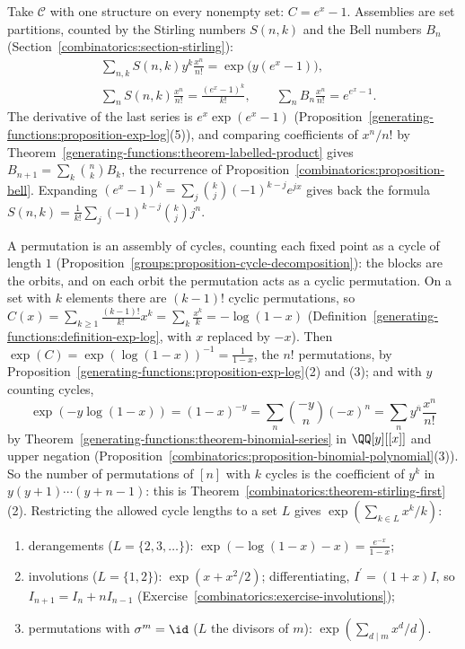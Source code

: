 \begin{example}\label{generating-functions:example-egf-partitions}
Take $\mathcal{C}$ with one structure on every nonempty set: $C = e^x - 1$. Assemblies are set partitions, counted by the Stirling numbers $S(n, k)$ and the Bell numbers $B_n$
(Section~\ref{combinatorics:section-stirling}):
\[
\begin{aligned}
&\sum_{n,k}S(n, k)y^k\frac{x^n}{n!} = \exp\bigl(y(e^x - 1)\bigr),\\
&\sum_nS(n, k)\frac{x^n}{n!} = \frac{(e^x - 1)^k}{k!}, \qquad \sum_nB_n\frac{x^n}{n!} = e^{e^x - 1}.
\end{aligned}
\]
The derivative of the last series is $e^x\exp(e^x - 1)$ (Proposition~\ref{generating-functions:proposition-exp-log}(5)), and comparing coefficients of $x^n/n!$ by
Theorem~\ref{generating-functions:theorem-labelled-product} gives $B_{n+1} = \sum_k\binom{n}{k}B_k$, the recurrence of Proposition~\ref{combinatorics:proposition-bell}. Expanding
$(e^x - 1)^k = \sum_j\binom{k}{j}(-1)^{k-j}e^{jx}$ gives back the formula $S(n, k) = \frac{1}{k!}\sum_j(-1)^{k-j}\binom{k}{j}j^n$.
\end{example}

\begin{example}\label{generating-functions:example-egf-cycles}
A permutation is an assembly of cycles, counting each fixed point as a cycle of length $1$ (Proposition~\ref{groups:proposition-cycle-decomposition}): the blocks are the orbits, and on each
orbit the permutation acts as a cyclic permutation. On a set with $k$ elements there are $(k - 1)!$ cyclic permutations, so
$C(x) = \sum_{k \geq 1}\frac{(k-1)!}{k!}x^k = \sum_k\frac{x^k}{k} = -\log(1 - x)$ (Definition~\ref{generating-functions:definition-exp-log}, with $x$ replaced by $-x$). Then
$\exp(C) = \exp(\log(1 - x))^{-1} = \frac{1}{1 - x}$, the $n!$ permutations, by Proposition~\ref{generating-functions:proposition-exp-log}(2) and (3); and with $y$ counting cycles,
\[
\exp(-y\log(1 - x)) = (1 - x)^{-y} = \sum_n\binom{-y}{n}(-x)^n = \sum_ny^{\overline{n}}\frac{x^n}{n!}
\]
by Theorem~\ref{generating-functions:theorem-binomial-series} in $\QQ[y][[x]]$ and upper negation (Proposition~\ref{combinatorics:proposition-binomial-polynomial}(3)). So the number of permutations of $[n]$ with $k$
cycles is the coefficient of $y^k$ in $y(y + 1) \cdots (y + n - 1)$: this is Theorem~\ref{combinatorics:theorem-stirling-first}(2). Restricting the allowed cycle lengths to a set $L$ gives
$\exp(\sum_{k \in L}x^k/k)$:
\begin{enumerate}
\item derangements ($L = \{2, 3, \ldots\}$): $\exp(-\log(1 - x) - x) = \frac{e^{-x}}{1 - x}$;
\item involutions ($L = \{1, 2\}$): $\exp(x + x^2/2)$; differentiating, $I^{\prime} = (1 + x)I$, so $I_{n+1} = I_n + nI_{n-1}$ (Exercise~\ref{combinatorics:exercise-involutions});
\item permutations with $\sigma^m = \id$ ($L$ the divisors of $m$): $\exp(\sum_{d \mid m}x^d/d)$.
\end{enumerate}
\end{example}

